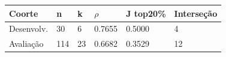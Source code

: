\begin{tabular}{llllll}
\hline
Coorte & n & k & $\rho$ & J top20\% & Interseção \\
\hline
Desenvolv. & 30 & 6 & 0.7655 & 0.5000 & 4 \\
Avaliação & 114 & 23 & 0.6682 & 0.3529 & 12 \\
\hline
\end{tabular}
